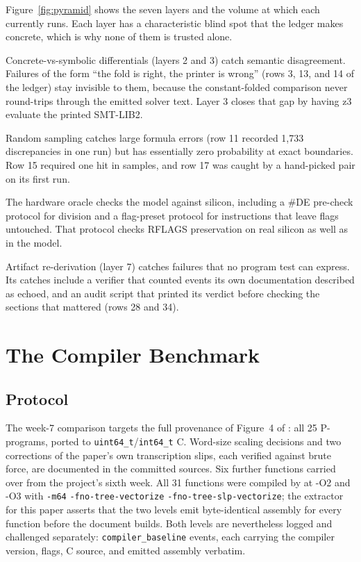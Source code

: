 \documentclass[journal,10pt]{IEEEtran}
\begin{document}
Figure~\ref{fig:pyramid} shows the seven layers and the volume at
which each currently runs. Each layer has a characteristic blind spot
that the ledger makes concrete, which is why none of them is trusted
alone.

Concrete-vs-symbolic differentials (layers 2 and 3) catch semantic
disagreement. Failures of the form ``the fold is right, the printer is
wrong'' (rows 3, 13, and 14 of the ledger) stay invisible to them,
because the constant-folded comparison never round-trips through the
emitted solver text. Layer 3 closes that gap by having z3 evaluate the
printed SMT-LIB2.

Random sampling catches large formula errors (row 11 recorded 1,733
discrepancies in one run) but has essentially zero probability at
exact boundaries. Row 15 required one hit in \ZSolverQueries{}
samples, and row 17 was caught by a hand-picked pair on its first run.

The hardware oracle checks the model against silicon, including a
\#DE pre-check protocol for division and a flag-preset protocol for
instructions that leave flags untouched. That protocol checks RFLAGS
preservation on real silicon as well as in the model.

Artifact re-derivation (layer 7) catches failures that no program
test can express. Its catches include a verifier that counted events
its own documentation described as echoed, and an audit script that
printed its verdict before checking the sections that mattered (rows
28 and 34).

\section{The Compiler Benchmark}
\label{sec:benchmark}

\subsection{Protocol}
The week-7 comparison targets the full provenance of Figure~4 of
\cite{gulwani11}: all 25 P-programs, ported to
\texttt{uint64\_t}/\texttt{int64\_t} C. Word-size scaling decisions
and two corrections of the paper's own transcription slips, each
verified against brute force, are documented in the committed sources.
Six further functions carried over from the project's sixth week. All
31 functions were compiled by \CompilerVersion{} at \mbox{-O2} and
\mbox{-O3} with \texttt{-m64} \texttt{-fno-tree-vectorize}
\texttt{-fno-tree-slp-vectorize}; the extractor for this paper asserts
that the two levels emit byte-identical assembly for every function
before the document builds. Both levels are nevertheless logged and
challenged separately: \NumBaselines{} \texttt{compiler\_baseline}
events, each carrying the compiler version, flags, C source, and
emitted assembly verbatim.
\end{document}
